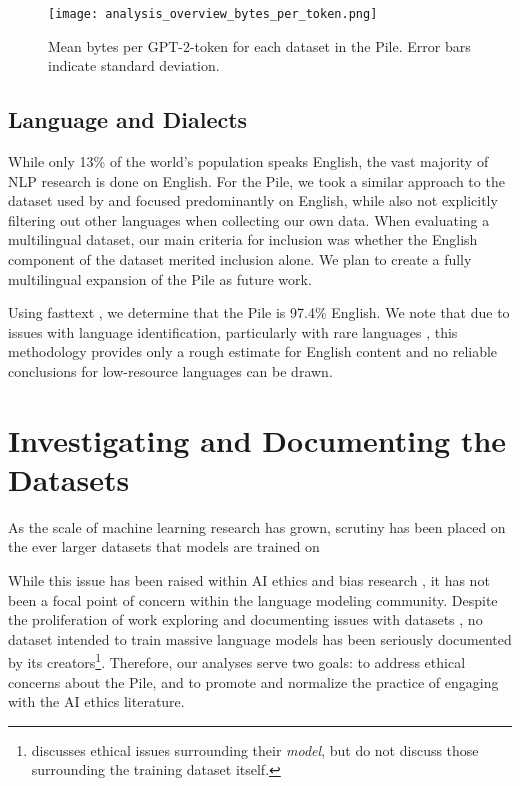 \documentclass[11pt,a4paper]{article}
\begin{document}
\begin{figure}[ht]
  \texttt{[image: analysis\_overview\_bytes\_per\_token.png]}
  \caption{Mean bytes per GPT-2-token for each dataset in the Pile. Error bars indicate standard deviation.}
  \label{fig:bytes_per_token}
\end{figure}

\subsection{Language and Dialects}

While only 13\% of the world's population speaks English, the vast majority of NLP research is done on English. For the Pile, we took a similar approach to the dataset used by \citet{GPT3} and focused predominantly on English, while also not explicitly filtering out other languages when collecting our own data. When evaluating a multilingual dataset, our main criteria for inclusion was whether the English component of the dataset merited inclusion alone. We plan to create a fully multilingual expansion of the Pile as future work.

Using fasttext \cite{fast-text}, we determine that the Pile is 97.4\% English. We note that due to issues with language identification, particularly with rare languages \citet{caswell2020language}, this methodology provides only a rough estimate for English content and no reliable conclusions for low-resource languages can be drawn. 



\section{Investigating and Documenting the Datasets}\label{sec:doc}

As the scale of machine learning research has grown, scrutiny has been placed on the ever larger datasets that models are trained on \citep{pyrrhic-cv,best-practice2}

While this issue has been raised within AI ethics and bias research \citep{nlp-impact,disability-bias,nlp-bias-survey}, it has not been a focal point of concern within the language modeling community. Despite the proliferation of work exploring and documenting issues with datasets \citep{datasheets,datastatement,archives}, no dataset intended to train massive language models has been seriously documented by its creators\footnote{\citet{GPT3} discusses ethical issues surrounding their \textit{model}, but do not discuss those surrounding the training dataset itself.}. Therefore, our analyses serve two goals: to address ethical concerns about the Pile, and to promote and normalize the practice of engaging with the AI ethics literature.
\end{document}
